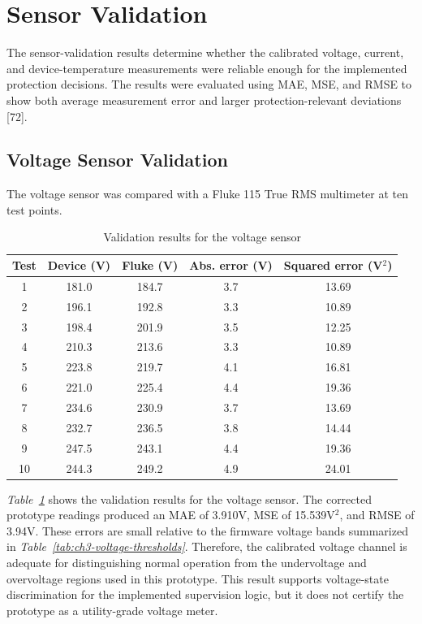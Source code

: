 \section{Sensor Validation}
\label{sec:ch4-sensor-validation}

The sensor-validation results determine whether the calibrated voltage, current,
and device-temperature measurements were reliable enough for the implemented
protection decisions. The results were evaluated using MAE, MSE, and RMSE to
show both average measurement error and larger protection-relevant deviations
[72].

\subsection{Voltage Sensor Validation}
\label{sec:ch4-voltage-validation}

The voltage sensor was compared with a Fluke 115 True RMS multimeter at ten
test points.

\begin{table}[H]
  \centering
  \caption{Validation results for the voltage sensor}
  \label{tab:ch4-voltage-validation}
  \begin{tabular}{ccccc}
    \toprule
    \textbf{Test} & \textbf{Device (V)} & \textbf{Fluke (V)} & \textbf{Abs. error (V)} & \textbf{Squared error (V$^2$)} \\
    \midrule
    1 & 181.0 & 184.7 & 3.7 & 13.69 \\
    2 & 196.1 & 192.8 & 3.3 & 10.89 \\
    3 & 198.4 & 201.9 & 3.5 & 12.25 \\
    4 & 210.3 & 213.6 & 3.3 & 10.89 \\
    5 & 223.8 & 219.7 & 4.1 & 16.81 \\
    6 & 221.0 & 225.4 & 4.4 & 19.36 \\
    7 & 234.6 & 230.9 & 3.7 & 13.69 \\
    8 & 232.7 & 236.5 & 3.8 & 14.44 \\
    9 & 247.5 & 243.1 & 4.4 & 19.36 \\
    10 & 244.3 & 249.2 & 4.9 & 24.01 \\
    \bottomrule
  \end{tabular}
\end{table}

\textit{Table~\ref{tab:ch4-voltage-validation}} shows the validation results
for the voltage sensor. The corrected prototype readings produced an MAE of
3.910V, MSE of 15.539V$^2$, and RMSE of 3.94V. These errors are small relative
to the firmware voltage bands summarized in
\textit{Table~\ref{tab:ch3-voltage-thresholds}}. Therefore, the calibrated
voltage channel is adequate for distinguishing normal operation from the
undervoltage and overvoltage regions used in this prototype. This result
supports voltage-state discrimination for the implemented supervision logic, but
it does not certify the prototype as a utility-grade voltage meter.

